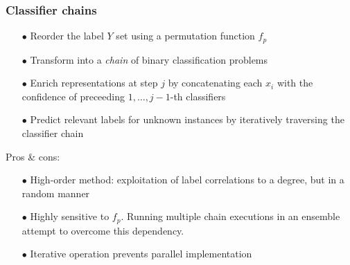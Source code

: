 \documentclass{beamer}
\begin{document}
\begin{frame}
\frametitle{Classifier chains}
\begin{itemize}
\item[$\bullet$] Reorder the label $Y$ set using a permutation function $f_p$ 
\item[$\bullet$] Transform into a \emph{chain} of binary classification problems
\item[$\bullet$] Enrich representations at step $j$ by concatenating each $x_i$ with the confidence of preceeding $1,\dots,j-1$-th classifiers
\item[$\bullet$] Predict relevant labels for unknown instances by iteratively traversing the classifier chain
\end{itemize}

Pros \& cons:
\begin{itemize}
\item[$\bullet$] High-order method: exploitation of label correlations to a degree, but in a random manner
\item[$\bullet$] Highly sensitive to $f_p$. Running multiple chain executions in an ensemble
  attempt to overcome this dependency.
\item[$\bullet$] Iterative operation prevents parallel implementation
\end{itemize}
\end{frame}
\end{document}
